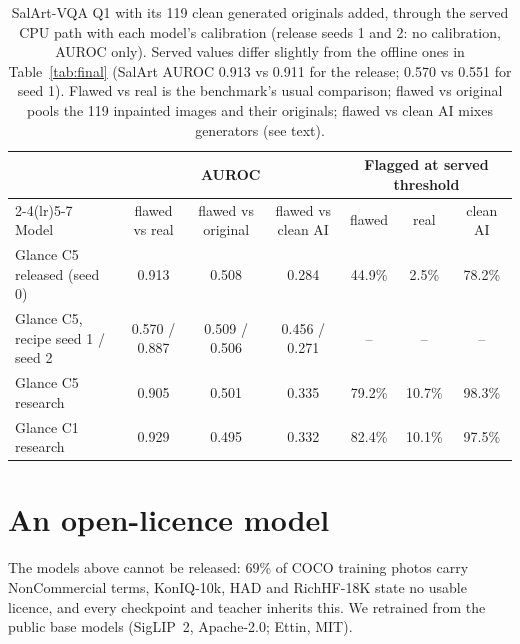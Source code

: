 \documentclass[10pt]{article}
\begin{document}
\begin{table}[t]
\centering\footnotesize
\caption{SalArt-VQA Q1 with its 119 clean generated originals added, through the served CPU path with each model's calibration (release seeds 1 and 2: no calibration, AUROC only). Served values differ slightly from the offline ones in Table~\ref{tab:final} (SalArt AUROC 0.913 vs 0.911 for the release; 0.570 vs 0.551 for seed 1). Flawed vs real is the benchmark's usual comparison; flawed vs original pools the 119 inpainted images and their originals; flawed vs clean AI mixes generators (see text).}
\label{tab:pairs}
\setlength\tabcolsep{4pt}
\begin{tabular}{lcccccc}
\toprule
 & \multicolumn{3}{c}{AUROC} & \multicolumn{3}{c}{Flagged at served threshold} \\
\cmidrule(lr){2-4}\cmidrule(lr){5-7}
Model & flawed vs real & flawed vs original & flawed vs clean AI & flawed & real & clean AI \\
\midrule
Glance C5 released (seed 0) & 0.913 & 0.508 & 0.284 & 44.9\% & 2.5\% & 78.2\% \\
Glance C5, recipe seed 1 / seed 2 & 0.570 / 0.887 & 0.509 / 0.506 & 0.456 / 0.271 & -- & -- & -- \\
Glance C5 research & 0.905 & 0.501 & 0.335 & 79.2\% & 10.7\% & 98.3\% \\
Glance C1 research & 0.929 & 0.495 & 0.332 & 82.4\% & 10.1\% & 97.5\% \\
\bottomrule
\end{tabular}
\end{table}

\section{An open-licence model}\label{sec:open}
The models above cannot be released: 69\% of COCO training photos carry NonCommercial terms, KonIQ-10k, HAD and RichHF-18K state no usable licence, and every checkpoint and teacher inherits this. We retrained from the public base models (SigLIP~2, Apache-2.0; Ettin, MIT).
\end{document}
